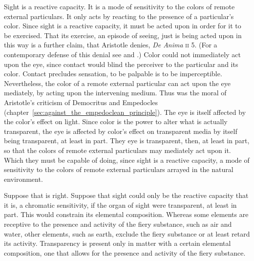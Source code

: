 Sight is a reactive capacity. It is a mode of sensitivity to the colors of remote external particulars. It only acts by reacting to the presence of a particular's color. Since sight is a reactive capacity, it must be acted upon in order for it to be exercised. That its exercise, an episode of seeing, just is being acted upon in this way is a further claim, that Aristotle denies, \emph{De Anima} \textsc{ii} 5. (For a contemporary defense of this denial see \citealt{Travis:2009fk} and \citealt{Kalderon:2012fk}.) Color could not immediately act upon the eye, since contact would blind the perceiver to the particular and its color. Contact precludes sensation, to be palpable is to be imperceptible. Nevertheless, the color of a remote external particular can act upon the eye mediately, by acting upon the intervening medium. Thus was the moral of Aristotle's criticism of Democritus and Empedocles (chapter~\ref{sec:against_the_empedoclean_principle}). The eye is itself affected by the color's effect on light. Since color is the power to alter what is actually transparent, the eye is affected by color's effect on transparent media by itself being transparent, at least in part. They eye is transparent, then, at least in part, so that the colors of remote external particulars may mediately act upon it. Which they must be capable of doing, since sight is a reactive capacity, a mode of sensitivity to the colors of remote external particulars arrayed in the natural environment.

Suppose that is right. Suppose that sight could only be the reactive capacity that it is, a chromatic sensitivity, if the organ of sight were transparent, at least in part. This would constrain its elemental composition. Whereas some elements are receptive to the presence and activity of the fiery substance, such as air and water, other elements, such as earth, exclude the fiery substance or at least retard its activity. Transparency is present only in matter with a certain elemental composition, one that allows for the presence and activity of the fiery substance.

